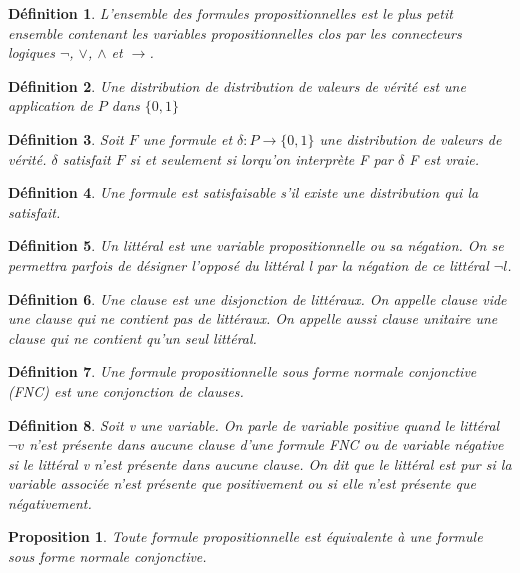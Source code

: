 \documentclass[12pt]{extarticle}
\newtheorem{mydef}{Définition}
\newtheorem{myprop}{Proposition}
\begin{document}
\begin{mydef} 
L'ensemble des formules propositionnelles est le plus petit ensemble contenant les variables propositionnelles clos par les connecteurs logiques $\lnot$, $\lor$, $\land$ et $\rightarrow$.
\end{mydef}

\begin{mydef}
Une distribution de distribution de valeurs de vérité est une application de $P$ dans $\{ 0, 1\}$
\end{mydef}

\begin{mydef}
Soit $F$ une formule et $\delta : P \rightarrow \{0, 1\}$ une distribution de valeurs de vérité. $\delta$ satisfait $F$ si et seulement si lorqu'on interprète F par $\delta$ F est vraie.
\end{mydef}

\begin{mydef}
Une formule est satisfaisable s'il existe une distribution qui la satisfait. 
\end{mydef}

\begin{mydef}
Un littéral est une variable propositionnelle ou sa négation. On se permettra parfois de désigner l'opposé du littéral l par la négation de ce littéral $\lnot{l}$.
\end{mydef}

\begin{mydef}
Une clause est une disjonction de littéraux. On appelle clause vide une clause qui ne contient pas de littéraux. On appelle aussi clause unitaire une clause qui ne contient qu'un seul littéral.
\end{mydef}

\begin{mydef}
Une formule propositionnelle sous forme normale conjonctive (FNC) est une conjonction de clauses.
\end{mydef}

\begin{mydef}
Soit v une variable. On parle de variable positive quand le littéral $\lnot{v}$ n'est présente dans aucune clause d'une formule FNC ou de variable négative si le littéral v n'est présente dans aucune clause. On dit que le littéral est pur si la variable associée n'est présente que positivement ou si elle n'est présente que négativement.
\end{mydef}

\begin{myprop}
Toute formule propositionnelle est équivalente à une formule sous forme normale conjonctive.
\end{myprop}
\end{document}
